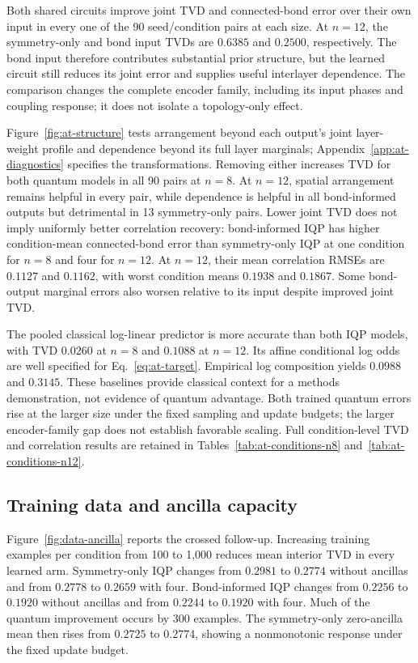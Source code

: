 \documentclass[pra,aps,10pt,twocolumn,floatfix,superscriptaddress,
notitlepage,longbibliography]{revtex4-2}
\begin{document}
Both shared circuits improve joint TVD and connected-bond error over their own input in every one of the 90 seed/condition pairs at each size. At $n=12$, the symmetry-only and bond input TVDs are $0.6385$ and $0.2500$, respectively. The bond input therefore contributes substantial prior structure, but the learned circuit still reduces its joint error and supplies useful interlayer dependence. The comparison changes the complete encoder family, including its input phases and coupling response; it does not isolate a topology-only effect.

Figure~\ref{fig:at-structure} tests arrangement beyond each output's joint layer-weight profile and dependence beyond its full layer marginals; Appendix~\ref{app:at-diagnostics} specifies the transformations. Removing either increases TVD for both quantum models in all 90 pairs at $n=8$. At $n=12$, spatial arrangement remains helpful in every pair, while dependence is helpful in all bond-informed outputs but detrimental in 13 symmetry-only pairs. Lower joint TVD does not imply uniformly better correlation recovery: bond-informed IQP has higher condition-mean connected-bond error than symmetry-only IQP at one condition for $n=8$ and four for $n=12$. At $n=12$, their mean correlation RMSEs are $0.1127$ and $0.1162$, with worst condition means $0.1938$ and $0.1867$. Some bond-output marginal errors also worsen relative to its input despite improved joint TVD.

The pooled classical log-linear predictor is more accurate than both IQP models, with TVD $0.0260$ at $n=8$ and $0.1088$ at $n=12$. Its affine conditional log odds are well specified for Eq.~\eqref{eq:at-target}. Empirical log composition yields $0.0988$ and $0.3145$. These baselines provide classical context for a methods demonstration, not evidence of quantum advantage. Both trained quantum errors rise at the larger size under the fixed sampling and update budgets; the larger encoder-family gap does not establish favorable scaling. Full condition-level TVD and correlation results are retained in Tables~\ref{tab:at-conditions-n8} and~\ref{tab:at-conditions-n12}.



\subsection{Training data and ancilla capacity}
\label{sec:data-ancilla-results}

Figure~\ref{fig:data-ancilla} reports the crossed follow-up. Increasing training examples per condition from 100 to 1,000 reduces mean interior TVD in every learned arm. Symmetry-only IQP changes from $0.2981$ to $0.2774$ without ancillas and from $0.2778$ to $0.2659$ with four. Bond-informed IQP changes from $0.2256$ to $0.1920$ without ancillas and from $0.2244$ to $0.1920$ with four. Much of the quantum improvement occurs by 300 examples. The symmetry-only zero-ancilla mean then rises from $0.2725$ to $0.2774$, showing a nonmonotonic response under the fixed update budget.
\end{document}

